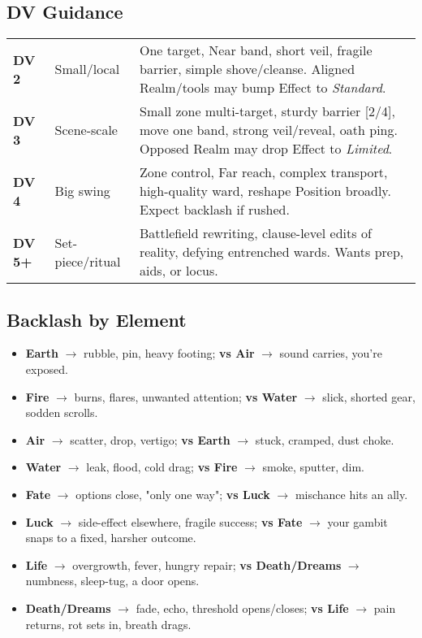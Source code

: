 \subsection{DV Guidance}
\begin{tabular}{@{}llp{9cm}@{}}
\textbf{DV 2} & Small/local & One target, Near band, short veil, fragile barrier, simple shove/cleanse. Aligned Realm/tools may bump Effect to \emph{Standard}. \\
\textbf{DV 3} & Scene-scale & Small zone multi-target, sturdy barrier [2/4], move one band, strong veil/reveal, oath ping. Opposed Realm may drop Effect to \emph{Limited}. \\
\textbf{DV 4} & Big swing & Zone control, Far reach, complex transport, high-quality ward, reshape Position broadly. Expect backlash if rushed. \\
\textbf{DV 5+} & Set-piece/ritual & Battlefield rewriting, clause-level edits of reality, defying entrenched wards. Wants prep, aids, or locus. \\
\end{tabular}

\subsection{Backlash by Element}
\begin{itemize}
  \item \textbf{Earth} $\rightarrow$ rubble, pin, heavy footing; \textbf{vs Air} $\rightarrow$ sound carries, you're exposed.
  \item \textbf{Fire} $\rightarrow$ burns, flares, unwanted attention; \textbf{vs Water} $\rightarrow$ slick, shorted gear, sodden scrolls.
  \item \textbf{Air} $\rightarrow$ scatter, drop, vertigo; \textbf{vs Earth} $\rightarrow$ stuck, cramped, dust choke.
  \item \textbf{Water} $\rightarrow$ leak, flood, cold drag; \textbf{vs Fire} $\rightarrow$ smoke, sputter, dim.
  \item \textbf{Fate} $\rightarrow$ options close, "only one way"; \textbf{vs Luck} $\rightarrow$ mischance hits an ally.
  \item \textbf{Luck} $\rightarrow$ side-effect elsewhere, fragile success; \textbf{vs Fate} $\rightarrow$ your gambit snaps to a fixed, harsher outcome.
  \item \textbf{Life} $\rightarrow$ overgrowth, fever, hungry repair; \textbf{vs Death/Dreams} $\rightarrow$ numbness, sleep-tug, a door opens.
  \item \textbf{Death/Dreams} $\rightarrow$ fade, echo, threshold opens/closes; \textbf{vs Life} $\rightarrow$ pain returns, rot sets in, breath drags.
\end{itemize}

